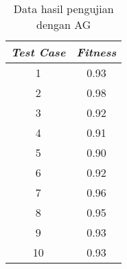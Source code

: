 



	
	
	
	\begin{table}[!h]
		\centering
		\begin{tabular}{|c|c|}
			\hline \textbf{\emph{Test Case}} & \textbf{\emph{Fitness}} \\ 
			\hline 1 & 0.93 \\ 
			\hline 2 & 0.98 \\ 
			\hline 3 & 0.92 \\ 
			\hline 4 & 0.91 \\ 
			\hline 5 & 0.90 \\ 
			\hline 6 & 0.92 \\ 
			\hline 7 & 0.96 \\ 
			\hline 8 & 0.95 \\ 
			\hline 9 & 0.93 \\ 
			\hline 10 & 0.93 \\ 
			\hline 
		\end{tabular}
		\caption[!h]{Data hasil pengujian dengan AG}
		\label{tab:1}
	\end{table}
	
